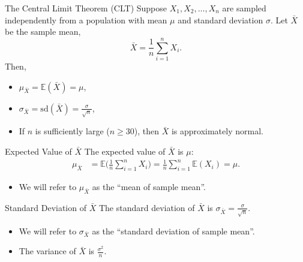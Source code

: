 \documentclass{beamer}
\newcommand{\E}{\mathbb{E}}
\newcommand{\sd}{\text{sd}}
\begin{document}
\begin{frame}{The Central Limit Theorem (CLT)}
    Suppose $X_1,X_2,\dots,X_n$ are sampled independently from a population with mean $\mu$ and 
    standard deviation $\sigma$. Let $\bar X$ be the sample mean, 
    $$\bar X = \frac{1}{n} \sum_{i=1}^n X_i.$$
    Then,
    \begin{itemize}
        \item  $\mu_{\bar X}= \E(\bar X) = \mu$,
        \item $\sigma_{\bar X} =\sd(\bar X) =  \frac{\sigma}{\sqrt{n}}$,
        \item  If $n$ is sufficiently large ($n\geq 30$), then $\bar X$ is approximately normal.
    \end{itemize}
\end{frame}

\begin{frame}{Expected Value of $\bar X$}
    The expected value of $\bar X$ is $\mu$:
    \begin{align*}
        \mu_{\bar X} & = \E\Big( \frac{1}{n} \sum_{i=1}^n X_i\Big) 
                     = \frac{1}{n} \sum_{i=1}^n \E(X_i) 
                     = \mu.
    \end{align*}

\begin{itemize}
    \item We will refer to $\mu_{\bar X}$ as the ``mean of sample mean''.
\end{itemize}
\end{frame}

\begin{frame}{Standard Deviation of $\bar X$}
    The standard deviation of $\bar X$ is $\sigma_{\bar X} = \frac{\sigma}{\sqrt{n}}$.

\begin{itemize}
    \item We will refer to $\sigma_{\bar X}$ as the ``standard deviation of sample mean''.
    \item The variance of $\bar X$ is $\frac{\sigma^2}{n}$.
\end{itemize}
\end{frame}
\end{document}
